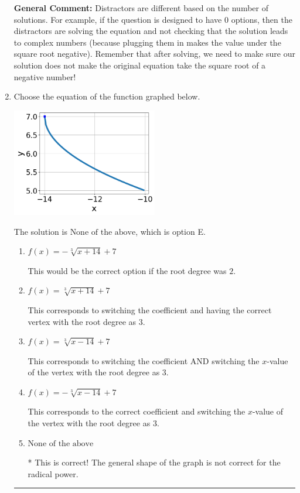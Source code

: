 \documentclass{extbook}[14pt]
\newcommand{\litem}[1]{\item #1

\rule{\textwidth}{0.4pt}}
\begin{document}
\begin{enumerate}
{\textbf{General Comment:} Distractors are different based on the number of solutions. For example, if the question is designed to have 0 options, then the distractors are solving the equation and not checking that the solution leads to complex numbers (because plugging them in makes the value under the square root negative). Remember that after solving, we need to make sure our solution does not make the original equation take the square root of a negative number!
}
\litem{
Choose the equation of the function graphed below.

\begin{center}
    \includegraphics[width=0.5\textwidth]{../Figures/radicalGraphToEquationCopyC.png}
\end{center}


The solution is \( \text{None of the above} \), which is option E.\begin{enumerate}[label=\Alph*.]
\item \( f(x) = - \sqrt[3]{x + 14} + 7 \)

This would be the correct option if the root degree was $2$.
\item \( f(x) = \sqrt[3]{x + 14} + 7 \)

This corresponds to switching the coefficient and having the correct vertex with the root degree as $3$.
\item \( f(x) = \sqrt[3]{x - 14} + 7 \)

This corresponds to switching the coefficient AND switching the $x$-value of the vertex with the root degree as $3$.
\item \( f(x) = - \sqrt[3]{x - 14} + 7 \)

This corresponds to the correct coefficient and switching the $x$-value of the vertex with the root degree as $3$.
\item \( \text{None of the above} \)

* This is correct! The general shape of the graph is not correct for the radical power.
\end{enumerate}

}
\end{enumerate}
\end{document}
